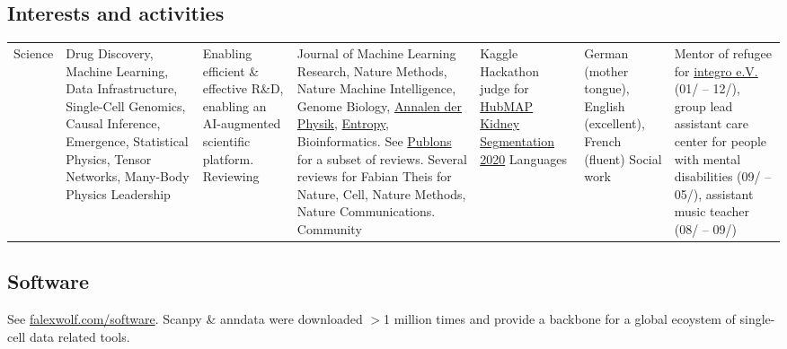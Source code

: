 \subsection*{Interests and activities}\vspace{-1em}
\begin{longtable}[t]{R{\widthC} p{\widthB}}
Science
& Drug Discovery, Machine Learning, Data Infrastructure, Single-Cell Genomics, Causal Inference, Emergence,  Statistical Physics, Tensor Networks, Many-Body Physics
\newline
Leadership 
& Enabling efficient \& effective R\&D, enabling an AI-augmented scientific platform.
\newline
Reviewing
& Journal of Machine Learning Research, Nature Methods, Nature Machine Intelligence, Genome Biology,  \href{https://en.wikipedia.org/wiki/Annalen_der_Physik}{Annalen der  Physik}, \href{https://en.wikipedia.org/wiki/Entropy_(journal)}{Entropy}, Bioinformatics. See \href{https://publons.com/author/1299815/f-alexander-wolf}{Publons} for a subset of reviews. Several reviews for Fabian Theis for Nature, Cell, Nature Methods, Nature Communications.
\newline
Community
& Kaggle Hackathon judge for \href{https://www.kaggle.com/c/hubmap-kidney-segmentation}{HubMAP Kidney Segmentation 2020}
\newline
Languages
& German (mother tongue), English (excellent), French (fluent)
\newline
Social work
& Mentor of refugee for \href{http://integro-ev.de/}{integro e.V.} (01/ -- 12/), group lead assistant care center for people with mental disabilities (09/ -- 05/), assistant music teacher (08/ -- 09/)
\end{longtable}

\subsection*{Software}
See \href{http://falexwolf.com/software/}{falexwolf.com/software}. Scanpy \& anndata were downloaded $>$1 million times and provide a backbone for a global ecoystem of single-cell data related tools.

